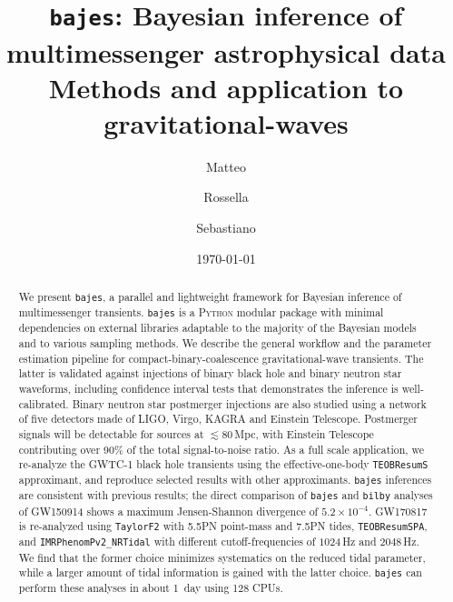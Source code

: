 \documentclass[prd,aps,twocolumn,a4paper,showkeys,nofootinbib,floatfix]{revtex4-1}
\newcommand{\bajes}{{\tt bajes}}
\newcommand{\py}{\textsc{Python}}
\begin{document}
\title{{\bajes}: Bayesian inference of multimessenger astrophysical data \\
  Methods and application to gravitational-waves}

\author{Matteo }
\author{Rossella }
\author{Sebastiano }

\date{\today}

\begin{abstract}
  We present {\bajes}, a parallel and lightweight
  framework for Bayesian inference
  of multimessenger transients.
  {\bajes} is a {\py} modular package with minimal dependencies on
  external libraries adaptable to the majority of the Bayesian models
  and to various sampling methods. 
  We describe the general workflow 
  and the parameter estimation pipeline for compact-binary-coalescence
  gravitational-wave transients. The latter is validated against
  injections  
  of binary black hole and binary neutron star waveforms, including
  confidence interval tests that demonstrates the inference is well-calibrated.     
  Binary neutron star postmerger injections are also studied 
  using a network of five detectors made of LIGO, Virgo, KAGRA
  and Einstein Telescope. Postmerger signals will be detectable
  for sources at ${\lesssim}80\,$Mpc,
  with Einstein Telescope contributing over 90\% of the total signal-to-noise ratio.
  As a full scale application, we re-analyze the GWTC-1 black hole transients using the 
  effective-one-body {\tt TEOBResumS} approximant, and reproduce
  selected results with other approximants.
  {\tt bajes} inferences are 
  consistent with previous results;
  the direct comparison of {\bajes} and {\tt bilby} analyses of GW150914 
  shows a maximum Jensen-Shannon divergence of $5.2{\times}10^{-4}$.
  GW170817 is re-analyzed using
  {\tt TaylorF2} with 5.5PN point-mass and 7.5PN tides,
  {\tt TEOBResumSPA},
  and {\tt IMRPhenomPv2\_NRTidal} with different cutoff-frequencies of $1024\,$Hz and $2048\,$Hz.
  We find that the former choice minimizes systematics on the reduced tidal
  parameter, while a larger amount of tidal information is gained with the latter choice. 
  {\bajes} can perform these analyses in about 1~day using 128 CPUs.
\end{abstract}
\end{document}
